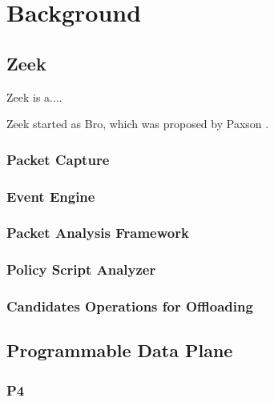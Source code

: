 \chapter{Background}
\label{cap:background}



\section{Zeek}
\label{sec:zeek}

Zeek is a.... \cite{AboutZeek}

Zeek started as Bro, which was proposed by Paxson \cite{Paxson1999}.

\subsection{Packet Capture}

\subsection{Event Engine}
\label{sec:zeek_ee}

\subsection{Packet Analysis Framework}
\label{sec:zeek:packet_analysis}

\subsection{Policy Script Analyzer}
\label{sec:zeek_psi}

\subsection{Candidates Operations for Offloading}
\label{sec:zeek_candidate_operations}

\section{Programmable Data Plane}
\label{sec:pdp}

\subsection{P4}
\label{sec:p4}
